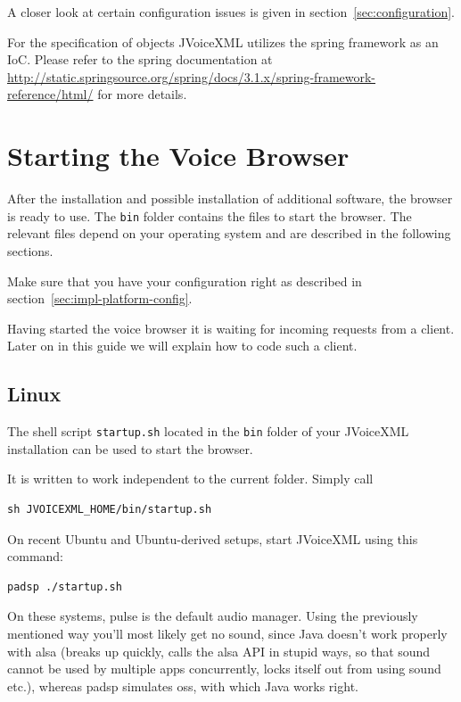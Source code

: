 \documentclass[11pt,a4paper]{book}
\begin{document}
A closer look at certain configuration issues is given in
section~\ref{sec:configuration}.

For the specification of objects JVoiceXML utilizes the spring framework as an
IoC. Please refer to the spring documentation at
\url{http://static.springsource.org/spring/docs/3.1.x/spring-framework-reference/html/}
for more details.

\section{Starting the Voice Browser}

After the installation and possible installation of additional software, the
browser is ready to use. The \texttt{bin} folder contains the files to start
the browser. The relevant files depend on your operating system and are
described in the following sections.

Make sure that you have your configuration right as described in
section~\ref{sec:impl-platform-config}.

Having started the voice browser it is waiting for incoming requests from a
client. Later on in this guide we will explain how to code such a client.

\subsection{Linux}

The shell script \texttt{startup.sh} located in the \texttt{bin} folder
of your JVoiceXML installation can be used to start the browser.

It is written to work independent to the current folder. Simply call

\begin{lstlisting}
sh JVOICEXML_HOME/bin/startup.sh
\end{lstlisting}

On recent Ubuntu and Ubuntu-derived setups, start JVoiceXML using this command:
\begin{lstlisting}
padsp ./startup.sh
\end{lstlisting}

On these systems, pulse is the default audio manager. Using the previously
mentioned way you'll most likely get no
sound, since Java doesn't work properly with alsa (breaks up quickly, calls
the alsa API in stupid ways, so that sound cannot be used by multiple apps
concurrently, locks itself out from using sound etc.), whereas padsp simulates
oss, with which Java works right.
\end{document}
